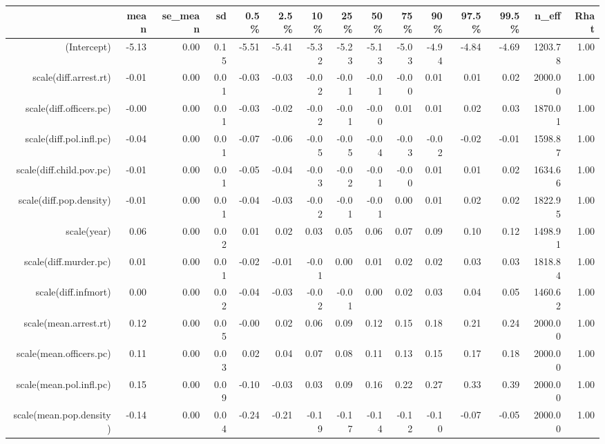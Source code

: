 \begin{table}[ht]
\centering
\begin{tabular}{rrrrrrrrrrrrrrr}
  \hline
 & mean & se\_mean & sd & 0.5\% & 2.5\% & 10\% & 25\% & 50\% & 75\% & 90\% & 97.5\% & 99.5\% & n\_eff & Rhat \\ 
  \hline
(Intercept) & -5.13 & 0.00 & 0.15 & -5.51 & -5.41 & -5.32 & -5.23 & -5.13 & -5.03 & -4.94 & -4.84 & -4.69 & 1203.78 & 1.00 \\ 
  scale(diff.arrest.rt) & -0.01 & 0.00 & 0.01 & -0.03 & -0.03 & -0.02 & -0.01 & -0.01 & -0.00 & 0.01 & 0.01 & 0.02 & 2000.00 & 1.00 \\ 
  scale(diff.officers.pc) & -0.00 & 0.00 & 0.01 & -0.03 & -0.02 & -0.02 & -0.01 & -0.00 & 0.01 & 0.01 & 0.02 & 0.03 & 1870.01 & 1.00 \\ 
  scale(diff.pol.infl.pc) & -0.04 & 0.00 & 0.01 & -0.07 & -0.06 & -0.05 & -0.05 & -0.04 & -0.03 & -0.02 & -0.02 & -0.01 & 1598.87 & 1.00 \\ 
  scale(diff.child.pov.pc) & -0.01 & 0.00 & 0.01 & -0.05 & -0.04 & -0.03 & -0.02 & -0.01 & -0.00 & 0.01 & 0.01 & 0.02 & 1634.66 & 1.00 \\ 
  scale(diff.pop.density) & -0.01 & 0.00 & 0.01 & -0.04 & -0.03 & -0.02 & -0.01 & -0.01 & 0.00 & 0.01 & 0.02 & 0.02 & 1822.95 & 1.00 \\ 
  scale(year) & 0.06 & 0.00 & 0.02 & 0.01 & 0.02 & 0.03 & 0.05 & 0.06 & 0.07 & 0.09 & 0.10 & 0.12 & 1498.91 & 1.00 \\ 
  scale(diff.murder.pc) & 0.01 & 0.00 & 0.01 & -0.02 & -0.01 & -0.01 & 0.00 & 0.01 & 0.02 & 0.02 & 0.03 & 0.03 & 1818.84 & 1.00 \\ 
  scale(diff.infmort) & 0.00 & 0.00 & 0.02 & -0.04 & -0.03 & -0.02 & -0.01 & 0.00 & 0.02 & 0.03 & 0.04 & 0.05 & 1460.62 & 1.00 \\ 
  scale(mean.arrest.rt) & 0.12 & 0.00 & 0.05 & -0.00 & 0.02 & 0.06 & 0.09 & 0.12 & 0.15 & 0.18 & 0.21 & 0.24 & 2000.00 & 1.00 \\ 
  scale(mean.officers.pc) & 0.11 & 0.00 & 0.03 & 0.02 & 0.04 & 0.07 & 0.08 & 0.11 & 0.13 & 0.15 & 0.17 & 0.18 & 2000.00 & 1.00 \\ 
  scale(mean.pol.infl.pc) & 0.15 & 0.00 & 0.09 & -0.10 & -0.03 & 0.03 & 0.09 & 0.16 & 0.22 & 0.27 & 0.33 & 0.39 & 2000.00 & 1.00 \\ 
  scale(mean.pop.density) & -0.14 & 0.00 & 0.04 & -0.24 & -0.21 & -0.19 & -0.17 & -0.14 & -0.12 & -0.10 & -0.07 & -0.05 & 2000.00 & 1.00 \\ 

\end{tabular}
\end{table}
